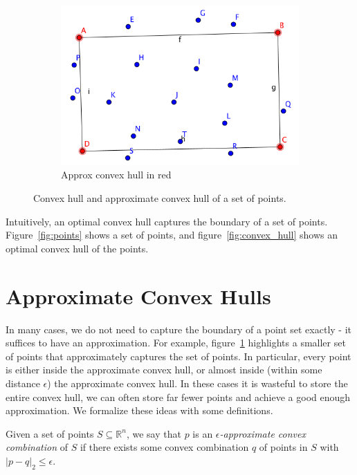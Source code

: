 \begin{figure}[!htb]
\begin{subfigure}[b]{.33\linewidth}
\includegraphics[width=\linewidth]{approximate_convex_hull}
\caption{Approx convex hull in red}\label{fig:approx_convex_hull}
\end{subfigure}
\caption{Convex hull and approximate convex hull of a set of points.}
\label{fig:hull_overview}
\end{figure}

Intuitively, an optimal convex hull captures the boundary of a set of points. Figure~\ref{fig:points} shows a set of points, and figure~\ref{fig:convex_hull} shows an optimal convex hull of the points. 

\section{Approximate Convex Hulls}

In many cases, we do not need to capture the boundary of a point set exactly - it suffices to have an approximation. For example, figure~\ref{fig:approx_convex_hull} highlights a smaller set of points that approximately captures the set of points. In particular, every point is either inside the approximate convex hull, or almost inside (within some distance $\epsilon$) the approximate convex hull. In these cases it is wasteful to store the entire convex hull, we can often store far fewer points and achieve a good enough approximation. We formalize these ideas with some definitions.

\begin{definition}
Given a set of points $S \subseteq \mathbb{R}^n$, we say that $p$ is an \emph{$\epsilon$-approximate convex combination} of $S$ if there exists some convex combination $q$ of points in $S$ with $|p - q|_2 \leq \epsilon$.
\end{definition}

